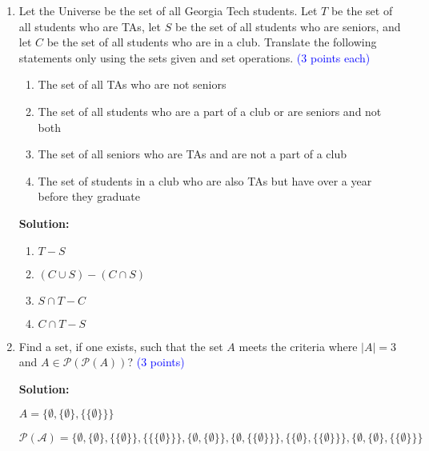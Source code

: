 \documentclass{article}
\newcommand{\pt}[1]{\textcolor{blue}{(#1 points)}}
\newcommand{\pte}[1]{\textcolor{blue}{(#1 points each)}}
\newenvironment{solution}
{
\par
\color{blue}
\textbf{Solution:}
}
{
\par
}
\begin{document}
\begin{enumerate}
    \item Let the Universe be the set of all Georgia Tech students. Let $T$ be the set of all students who are TAs, let $S$ be the set of all students who are seniors, and let $C$ be the set of all students who are in a club. Translate the following statements only using the sets given and set operations. \pte{3}
        \begin{enumerate}
            \item The set of all TAs who are not seniors
            \item The set of all students who are a part of a club or are seniors and not both
            \item The set of all seniors who are TAs and are not a part of a club
            \item The set of students in a club who are also TAs but have over a year before they graduate
        \end{enumerate}
    \begin{solution}
    \begin{enumerate}
        \item $T - S$
        \item $(C \cup S) - (C \cap S)$
        \item $S \cap T - C$
        \item $C \cap T - S$
    \end{enumerate}
    \end{solution}
    
    \item Find a set, if one exists, such that the set $A$ meets the criteria where $|A| = 3$ and $A \in \mathcal{P}(\mathcal{P}(A))$? \pt{3}
    \begin{solution}
    $A = \{\emptyset, \{\emptyset\}, \{\{\emptyset\}\}\}$
    
    $\mathcal{P(A)} = \{\emptyset, \{\emptyset\}, \{\{\emptyset\}\}, \{\{\{\emptyset\}\}\}, \{\emptyset, \{\emptyset\}\}, \{\emptyset, \{\{\emptyset\}\}\}, \{\{\emptyset\}, \{\{\emptyset\}\}\}, \{\emptyset, \{\emptyset\}, \{\{\emptyset\}\}\}$
    

\end{solution}
\end{enumerate}
\end{document}
